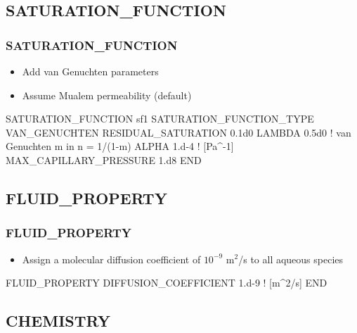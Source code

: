 \documentclass{beamer}
\newcommand\bluecomment[1]{{{\color{blue} #1}}}
\begin{document}
\subsection{SATURATION\_FUNCTION}

\begin{frame}[fragile]\frametitle{SATURATION\_FUNCTION}

\begin{itemize}
\item Add van Genuchten parameters
\item Assume Mualem permeability (default)
\end{itemize}

\begin{semiverbatim}
SATURATION_FUNCTION sf1
  SATURATION_FUNCTION_TYPE VAN_GENUCHTEN
  RESIDUAL_SATURATION 0.1d0
  LAMBDA 0.5d0     \bluecomment{! van Genuchten m in n = 1/(1-m)}
  ALPHA 1.d-4      \bluecomment{! [Pa^-1]}
  MAX_CAPILLARY_PRESSURE 1.d8
END
\end{semiverbatim}

\end{frame}

\subsection{FLUID\_PROPERTY}

\begin{frame}\frametitle{FLUID\_PROPERTY}

\begin{itemize}
  \item Assign a molecular diffusion coefficient of $10^{-9}$ m$^2$/s to all aqueous species
\end{itemize}

\begin{semiverbatim}

FLUID_PROPERTY
  DIFFUSION_COEFFICIENT 1.d-9   \bluecomment{! [m^2/s]}
END
\end{semiverbatim}

\end{frame}

\subsection{CHEMISTRY}
\end{document}
